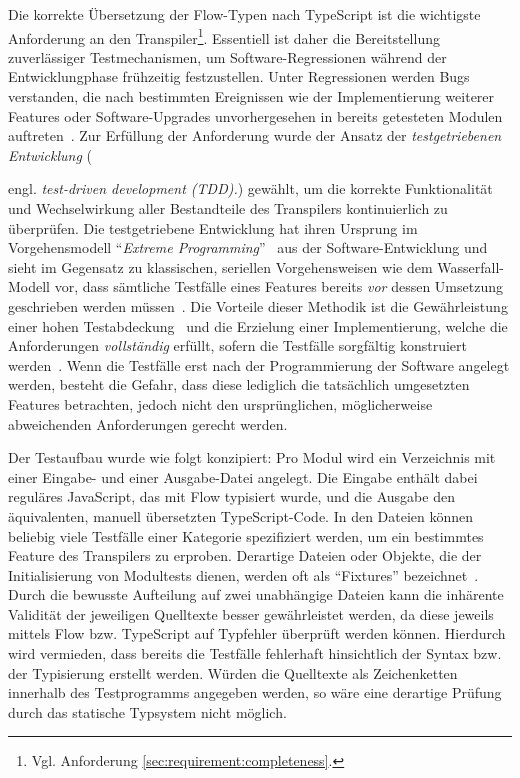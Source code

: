 Die korrekte Übersetzung der Flow-Typen nach TypeScript ist die wichtigste Anforderung an den Transpiler\footnote{Vgl. Anforderung \ref{sec:requirement:completeness}.}. Essentiell ist daher die Bereitstellung zuverlässiger Testmechanismen, um Software-Regressionen während der Entwicklungphase frühzeitig festzustellen. Unter Regressionen werden Bugs verstanden, die nach bestimmten Ereignissen wie der Implementierung weiterer Features oder Software-Upgrades unvorhergesehen in bereits getesteten Modulen auftreten~\autocite[218]{DOR:SOFTWARE_TEST}. Zur Erfüllung der Anforderung wurde der Ansatz der \emph{testgetriebenen Entwicklung} ({engl. \textit{test-driven development (TDD).}) gewählt, um die korrekte Funktionalität und Wechselwirkung aller Bestandteile des Transpilers kontinuierlich zu überprüfen. Die testgetriebene Entwicklung hat ihren Ursprung im Vorgehensmodell \enquote{\textit{Extreme Programming}}~\autocite{JEFFRIES:EXTREME_PROGRAMMING} aus der Software-Entwicklung und sieht im Gegensatz zu klassischen, seriellen Vorgehensweisen wie dem Wasserfall-Modell vor, dass sämtliche Testfälle eines Features bereits \emph{vor} dessen Umsetzung geschrieben werden müssen~\autocite{BECK:EXTREME_PROGRAMMING}. Die Vorteile dieser Methodik ist die Gewährleistung einer hohen Testabdeckung~\autocite[90]{BECK:TDD} und die Erzielung einer Implementierung, welche die Anforderungen \emph{vollständig} erfüllt, sofern die Testfälle sorgfältig konstruiert werden~\autocite[214]{BECK:TDD}. Wenn die Testfälle erst nach der Programmierung der Software angelegt werden, besteht die Gefahr, dass diese lediglich die tatsächlich umgesetzten Features betrachten, jedoch nicht den ursprünglichen, möglicherweise abweichenden Anforderungen gerecht werden.

Der Testaufbau wurde wie folgt konzipiert: Pro Modul wird ein Verzeichnis mit einer Ein\-gabe- und einer Ausgabe-Datei angelegt. Die Eingabe enthält dabei reguläres JavaScript, das mit Flow typisiert wurde, und die Ausgabe den äquivalenten, manuell übersetzten TypeScript-Code. In den Dateien können beliebig viele Testfälle einer Kategorie spezifiziert werden, um ein bestimmtes Feature des Transpilers zu erproben. Derartige Dateien oder Objekte, die der Initialisierung von Modultests dienen, werden oft als \enquote{Fixtures} bezeichnet~\autocite{OLAN:2003}. Durch die bewusste Aufteilung auf zwei unabhängige Dateien kann die inhärente Validität der jeweiligen Quelltexte besser gewährleistet werden, da diese jeweils mittels Flow bzw. TypeScript auf Typfehler überprüft werden können. Hierdurch wird vermieden, dass bereits die Testfälle fehlerhaft hinsichtlich der Syntax bzw. der Typisierung erstellt werden. Würden die Quelltexte als Zeichenketten innerhalb des Testprogramms angegeben werden, so wäre eine derartige Prüfung durch das statische Typsystem nicht möglich.

}
